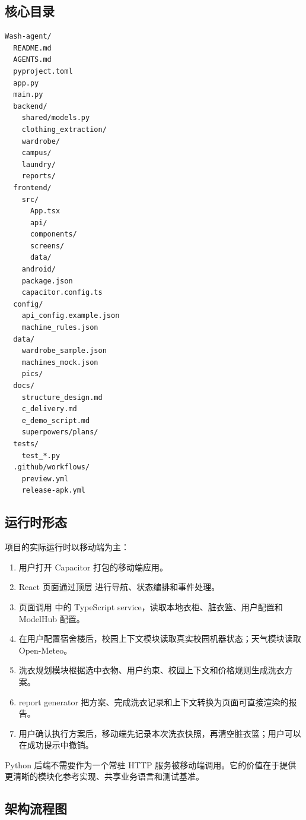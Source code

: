 \documentclass[11pt,a4paper]{ctexart}
\begin{document}
\subsection{核心目录}

\begin{lstlisting}[style=command]
Wash-agent/
  README.md
  AGENTS.md
  pyproject.toml
  app.py
  main.py
  backend/
    shared/models.py
    clothing_extraction/
    wardrobe/
    campus/
    laundry/
    reports/
  frontend/
    src/
      App.tsx
      api/
      components/
      screens/
      data/
    android/
    package.json
    capacitor.config.ts
  config/
    api_config.example.json
    machine_rules.json
  data/
    wardrobe_sample.json
    machines_mock.json
    pics/
  docs/
    structure_design.md
    c_delivery.md
    e_demo_script.md
    superpowers/plans/
  tests/
    test_*.py
  .github/workflows/
    preview.yml
    release-apk.yml
\end{lstlisting}

\subsection{运行时形态}

项目的实际运行时以移动端为主：

\begin{enumerate}
  \item 用户打开 Capacitor 打包的移动端应用。
  \item React 页面通过顶层  进行导航、状态编排和事件处理。
  \item 页面调用  中的 TypeScript service，读取本地衣柜、脏衣篮、用户配置和 ModelHub 配置。
  \item 在用户配置宿舍楼后，校园上下文模块读取真实校园机器状态；天气模块读取 Open-Meteo。
  \item 洗衣规划模块根据选中衣物、用户约束、校园上下文和价格规则生成洗衣方案。
  \item report generator 把方案、完成洗衣记录和上下文转换为页面可直接渲染的报告。
  \item 用户确认执行方案后，移动端先记录本次洗衣快照，再清空脏衣篮；用户可以在成功提示中撤销。
\end{enumerate}

Python 后端不需要作为一个常驻 HTTP 服务被移动端调用。它的价值在于提供更清晰的模块化参考实现、共享业务语言和测试基准。

\subsection{架构流程图}
\end{document}

